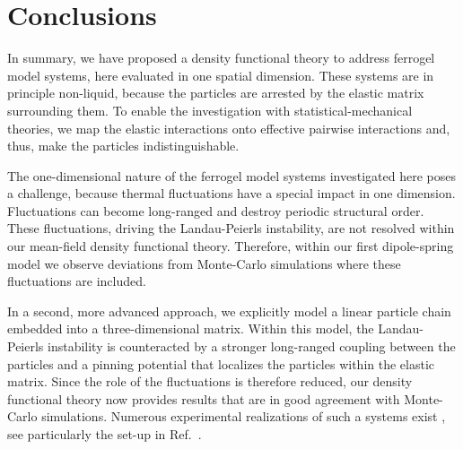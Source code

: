 \documentclass[aps,pre,twocolumn,superscriptaddress,nofootinbib]{revtex4}
\begin{document}
\section{Conclusions}
\label{Sec.Conclusions}

In summary, we have proposed a density functional theory to address ferrogel model systems, here evaluated in one spatial dimension. 
These systems are in principle non-liquid, because the particles are arrested by the elastic matrix surrounding them. 
To enable the investigation with statistical-mechanical theories, we map the elastic interactions onto effective pairwise interactions and, thus, make the particles indistinguishable. 

The one-dimensional nature of the ferrogel model systems investigated here poses a challenge, because thermal fluctuations have a special impact in one dimension. 
Fluctuations can become long-ranged and destroy periodic structural order. 
These fluctuations, driving the Landau-Peierls instability, are not resolved within our mean-field density functional theory. 
Therefore, within our first dipole-spring model we observe deviations from Monte-Carlo simulations where these fluctuations are included. 

In a second, more advanced approach, we explicitly model a linear particle chain embedded into a three-dimensional matrix. 
Within this model, the Landau-Peierls instability is counteracted by a stronger long-ranged coupling between the particles and a pinning potential that localizes the particles within the elastic matrix. 
Since the role of the fluctuations is therefore reduced, our density functional theory now provides results that are in good agreement with Monte-Carlo simulations. 
Numerous experimental realizations of such a systems exist \cite{collin2003frozen,varga2003smart,gunther2012xray, borbath2012xmuct,gundermann2013comparison,huang2016buckling,Gundermann2017_SmartMaterStruct}, see particularly the set-up in Ref.~. 
\end{document}
